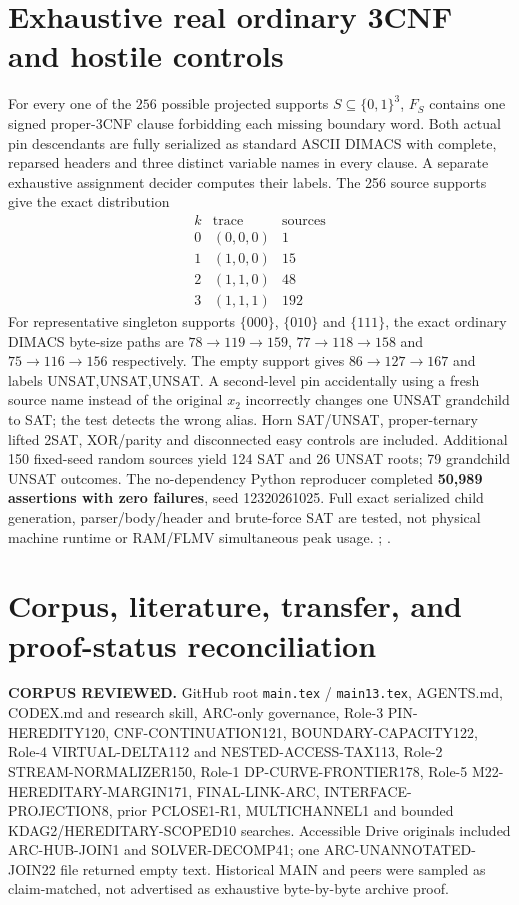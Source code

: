 \documentclass[11pt]{article}
\begin{document}
\section{Exhaustive real ordinary 3CNF and hostile controls}
For every one of the $256$ possible projected supports
$S\subseteq\{0,1\}^3$, $F_S$ contains one signed proper-3CNF
clause forbidding each missing boundary word. Both actual pin descendants
are fully serialized as standard ASCII DIMACS with complete, reparsed
headers and three distinct variable names in every clause. A
separate exhaustive assignment decider computes their labels.
The 256 source supports give the exact distribution
\[
\begin{array}{c|c|r}
k&\text{trace}&\text{sources}\\\hline
0&(0,0,0)&1\\
1&(1,0,0)&15\\
2&(1,1,0)&48\\
3&(1,1,1)&192
\end{array}
\]
For representative singleton supports $\{000\}$, $\{010\}$ and
$\{111\}$, the exact ordinary DIMACS byte-size paths are
$78\to119\to159$, $77\to118\to158$ and
$75\to116\to156$ respectively. The empty support gives
$86\to127\to167$ and labels UNSAT,UNSAT,UNSAT.
A second-level pin accidentally using a fresh source name instead of
the original $x_2$ incorrectly changes one UNSAT grandchild to SAT;
the test detects the wrong alias. Horn SAT/UNSAT,
proper-ternary lifted 2SAT, XOR/parity and disconnected easy controls
are included. Additional 150 fixed-seed random sources yield 124
SAT and 26 UNSAT roots; 79 grandchild UNSAT outcomes.
The no-dependency Python reproducer completed \textbf{50,989 assertions
with zero failures}, seed 12320261025. Full exact serialized child
generation, parser/body/header and brute-force SAT are tested, not
physical machine runtime or RAM/FLMV simultaneous peak usage.
;
.

\section{Corpus, literature, transfer, and proof-status reconciliation}
\textbf{CORPUS REVIEWED.} GitHub root \texttt{main.tex} / \texttt{main13.tex},
AGENTS.md, CODEX.md and research skill, ARC-only governance, Role-3
PIN-HEREDITY120, CNF-CONTINUATION121, BOUNDARY-CAPACITY122, Role-4
VIRTUAL-DELTA112 and NESTED-ACCESS-TAX113, Role-2 STREAM-NORMALIZER150,
Role-1 DP-CURVE-FRONTIER178, Role-5 M22-HEREDITARY-MARGIN171,
FINAL-LINK-ARC, INTERFACE-PROJECTION8, prior PCLOSE1-R1,
MULTICHANNEL1 and bounded KDAG2/HEREDITARY-SCOPED10 searches.
Accessible Drive originals included ARC-HUB-JOIN1 and SOLVER-DECOMP41;
one ARC-UNANNOTATED-JOIN22 file returned empty text.
Historical MAIN and peers were sampled as claim-matched, not advertised
as exhaustive byte-by-byte archive proof.
\end{document}
